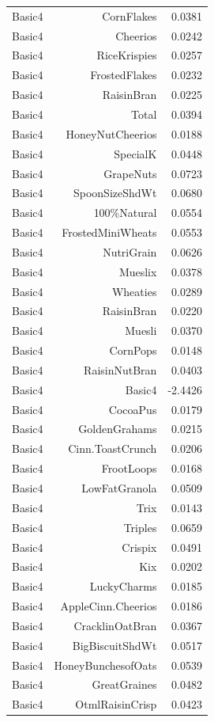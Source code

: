 \begin{longtable}{@{}lrr@{}}
Basic4 & CornFlakes & 0.0381 \\
Basic4 & Cheerios & 0.0242 \\
Basic4 & RiceKrispies & 0.0257 \\
Basic4 & FrostedFlakes & 0.0232 \\
Basic4 & RaisinBran & 0.0225 \\
Basic4 & Total & 0.0394 \\
Basic4 & HoneyNutCheerios & 0.0188 \\
Basic4 & SpecialK & 0.0448 \\
Basic4 & GrapeNuts & 0.0723 \\
Basic4 & SpoonSizeShdWt & 0.0680 \\
Basic4 & 100\%Natural & 0.0554 \\
Basic4 & FrostedMiniWheats & 0.0553 \\
Basic4 & NutriGrain & 0.0626 \\
Basic4 & Mueslix & 0.0378 \\
Basic4 & Wheaties & 0.0289 \\
Basic4 & RaisinBran & 0.0220 \\
Basic4 & Muesli & 0.0370 \\
Basic4 & CornPops & 0.0148 \\
Basic4 & RaisinNutBran & 0.0403 \\
Basic4 & Basic4 & -2.4426 \\
Basic4 & CocoaPus & 0.0179 \\
Basic4 & GoldenGrahams & 0.0215 \\
Basic4 & Cinn.ToastCrunch & 0.0206 \\
Basic4 & FrootLoops & 0.0168 \\
Basic4 & LowFatGranola & 0.0509 \\
Basic4 & Trix & 0.0143 \\
Basic4 & Triples & 0.0659 \\
Basic4 & Crispix & 0.0491 \\
Basic4 & Kix & 0.0202 \\
Basic4 & LuckyCharms & 0.0185 \\
Basic4 & AppleCinn.Cheerios & 0.0186 \\
Basic4 & CracklinOatBran & 0.0367 \\
Basic4 & BigBiscuitShdWt & 0.0517 \\
Basic4 & HoneyBunchesofOats & 0.0539 \\
Basic4 & GreatGraines & 0.0482 \\
Basic4 & OtmlRaisinCrisp & 0.0423 \\

\end{longtable}
